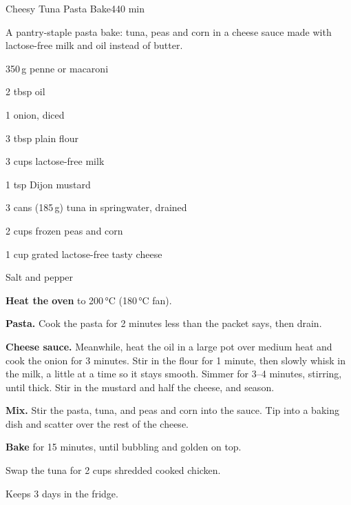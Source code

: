 \begin{recipebox}{Cheesy Tuna Pasta Bake}{4}{40 min}

A pantry-staple pasta bake: tuna, peas and corn in a cheese sauce made with
lactose-free milk and oil instead of butter.

\begin{ingredients}
  \item 350\,g penne or macaroni
  \item 2 tbsp oil
  \item 1 onion, diced
  \item 3 tbsp plain flour
  \item 3 cups lactose-free milk
  \item 1 tsp Dijon mustard
  \item 3 cans (185\,g) tuna in springwater, drained
  \item 2 cups frozen peas and corn
  \item 1 cup grated lactose-free tasty cheese
  \item Salt and pepper
\end{ingredients}

\begin{method}
  \item \textbf{Heat the oven} to 200\,°C (180\,°C fan).
  \item \textbf{Pasta.} Cook the pasta for 2 minutes less than the packet says,
        then drain.
  \item \textbf{Cheese sauce.} Meanwhile, heat the oil in a large pot over medium
        heat and cook the onion for 3 minutes. Stir in the flour for 1 minute, then
        slowly whisk in the milk, a little at a time so it stays smooth. Simmer for
        3--4 minutes, stirring, until thick. Stir in the mustard and half the
        cheese, and season.
  \item \textbf{Mix.} Stir the pasta, tuna, and peas and corn into the sauce. Tip into
        a baking dish and scatter over the rest of the cheese.
  \item \textbf{Bake} for 15 minutes, until bubbling and golden on top.
\end{method}

\begin{notelist}
  \item Swap the tuna for 2 cups shredded cooked chicken.
  \item Keeps 3 days in the fridge.
\end{notelist}

\end{recipebox}
